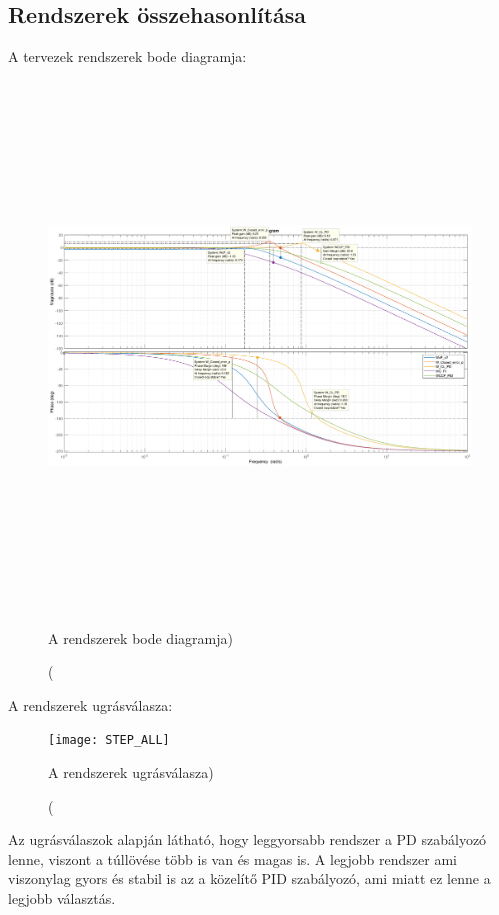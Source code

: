 \documentclass[12pt]{article}
\begin{document}
\subsection{Rendszerek összehasonlítása}
A tervezek rendszerek bode diagramja:
\begin{figure}[H]
\centering
\includegraphics[width=180mm,height=140mm]{BODE_ALL}
\caption(A rendszerek bode diagramja)
\end{figure}
A rendszerek ugrásválasza:
 \begin{figure}[H]
\centering
\texttt{[image: STEP\_ALL]}
\caption(A rendszerek ugrásválasza)
\end{figure}
Az ugrásválaszok alapján látható, hogy leggyorsabb rendszer a PD szabályozó lenne, viszont a túllövése több is van és magas is. A legjobb rendszer ami viszonylag gyors és stabil is az a közelítő PID szabályozó, ami miatt ez lenne a legjobb választás.
\end{document}
